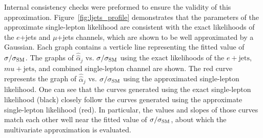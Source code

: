 


Internal consistency checks were preformed to ensure the validity of this approximation.  Figure~\ref{fig:ljets_profile} demonstrates that the parameters of the approximate single-lepton likelihood are consistent with the exact likelihoods of the $e$+jets and $\mu$+jets channels, which are shown to be well approximated by a Gaussian.
Each graph contains a verticle line representing the fitted value of $\sigma/\sigma_{\rm SM}$.
The graphs of $\hat{\hat{\alpha}}_j$ vs. $\sigma/\sigma_{\rm SM}$  using the exact likelihoods of the $e+\textrm{jets}$, $mu+\textrm{jets}$, and combined single-lepton channel are shown.
The red curve represents the graph of $\hat{\hat{\alpha}}_j$ vs. $\sigma/\sigma_{\rm SM}$ using the approximated single-lepton likelihood.
One can see that the curves generated using the exact single-lepton likelihood (black) closely follow the curves generated using the approximate single-lepton likelihood (red).
In particular, the values and slopes of those curves match each other well near the fitted value of $\sigma/\sigma_{\rm SM}$, about which the multivariate approximation is evaluated. 

